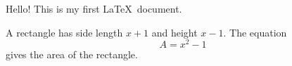 \documentclass{article}
\begin{document}
  Hello! This is my first \LaTeX\ document.

  A rectangle has side length $x+1$ and height $x-1$. The equation $$A=x^2-1$$ gives the area of the rectangle.
\end{document}
